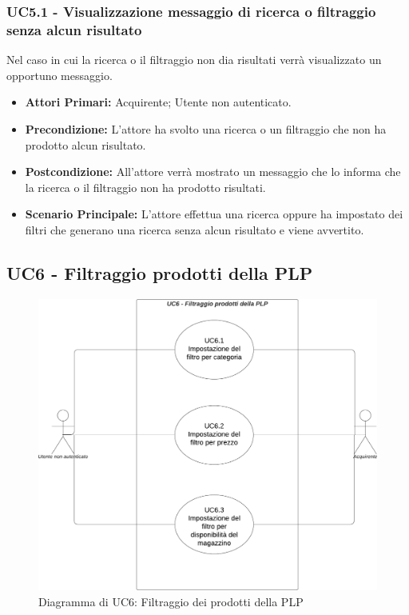 \subsubsection{UC5.1 - Visualizzazione messaggio di ricerca o filtraggio senza alcun risultato} \label{UC5.1}
Nel caso in cui la ricerca o il filtraggio non dia risultati verrà visualizzato un opportuno messaggio.
\begin{itemize}
    \item \textbf{Attori Primari:} Acquirente; Utente non autenticato. 
    \item \textbf{Precondizione:} L'attore ha svolto una ricerca o un filtraggio che non ha prodotto alcun risultato.
    \item \textbf{Postcondizione:} All'attore verrà mostrato un messaggio che lo informa che la ricerca o il filtraggio non ha prodotto risultati.
    \item \textbf{Scenario Principale:} L'attore effettua una ricerca oppure ha impostato dei filtri che generano una ricerca senza alcun risultato e viene avvertito.
\end{itemize}

\subsection{UC6 - Filtraggio prodotti della PLP} \label{UC6}

\begin{figure}[H]
    \centering
    \includegraphics[scale=0.5]{Immagini/DiagrammiUC/UC6FiltraggioProdottiDellaPLP.png}
    \caption{Diagramma di UC6: Filtraggio dei prodotti della PLP} 
\end{figure}

